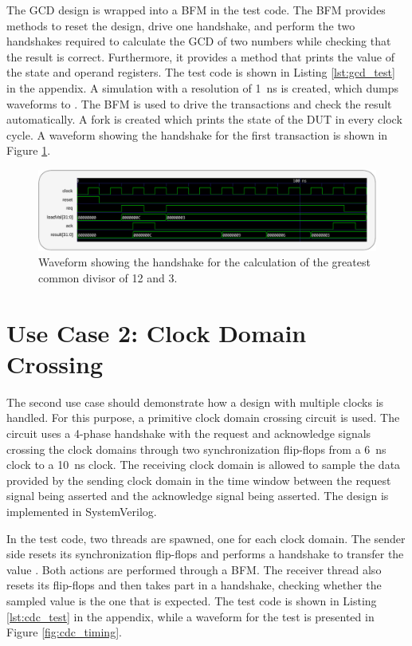 The GCD design is wrapped into a BFM in the test code. The BFM provides methods to reset the design, drive one
handshake, and perform the two handshakes required to calculate the GCD of two numbers while checking that the
result is correct. Furthermore, it provides a method that prints the value of the state and operand registers. The
test code is shown in Listing \ref{lst:gcd_test} in the appendix. A simulation with a resolution of \SI{1}{ns} is
created, which dumps waveforms to . The BFM is used to drive the transactions and check the result
automatically. A fork is created which prints the state of the DUT in every clock cycle. A waveform showing the
handshake for the first transaction is shown in Figure \ref{fig:gcd_timing}.

\begin{figure}[t]
  \centering
  \includegraphics[width=\textwidth]{diagrams/gcd_timing.pdf}
  \caption{Waveform showing the handshake for the calculation of the greatest common divisor of 12 and 3.}
  \label{fig:gcd_timing}
\end{figure}

\section{Use Case 2: Clock Domain Crossing} %

The second use case should demonstrate how a design with multiple clocks is handled. For this purpose, a primitive
clock domain crossing circuit is used. The circuit uses a 4-phase handshake with the request and acknowledge signals
crossing the clock domains through two synchronization flip-flops from a \SI{6}{ns} clock to a \SI{10}{ns} clock. The
receiving clock domain is allowed to sample the data provided by the sending clock domain in the time window between
the request signal being asserted and the acknowledge signal being asserted. The design is implemented in SystemVerilog.

In the test code, two threads are spawned, one for each clock domain. The sender side resets its synchronization
flip-flops and performs a handshake to transfer the value . Both actions are performed through a BFM.
The receiver thread also resets its flip-flops and then takes part in a handshake, checking whether the sampled value
is the one that is expected. The test code is shown in Listing \ref{lst:cdc_test} in the appendix, while a waveform
for the test is presented in Figure \ref{fig:cdc_timing}.

